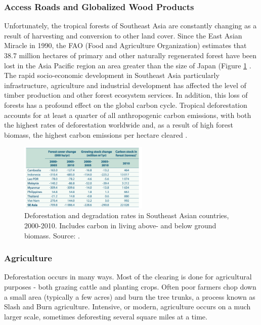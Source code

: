 \subsubsection{Access Roads and Globalized Wood Products}

Unfortunately, the tropical forests of Southeast Asia are constantly changing as a result of harvesting and conversion to other land cover. Since the East Asian Miracle in 1990, the FAO (Food and Agriculture Organization) estimates that 38.7 million hectares of primary and other naturally regenerated forest have been lost in the Asia Pacific region an area greater than the size of Japan (Figure \ref{fig:deforestation} \citep{faoun163agriculture}. The rapid socio-economic development in Southeast Asia particularly infrastructure, agriculture and industrial development has affected the level of timber production and other forest ecosystem services. In addition, this loss of forests has a profound effect on the global carbon cycle. Tropical deforestation accounts for at least a quarter of all anthropogenic carbon emissions, with both the highest rates of deforestation worldwide and, as a result of high forest biomass, the highest carbon emissions per hectare cleared \citep{corlett2014ecology}.

    \begin{figure}[ht]
    \centering
        \includegraphics[width = 0.55\textwidth]{graphics/carbonstock.png}
        \caption{Deforestation and degradation rates in Southeast Asian countries, 2000-2010. Includes carbon in living above- and below ground biomass. Source: \citep{faoun163agriculture}.}
				\label{fig:deforestation}
    \end{figure}

\subsubsection {Agriculture}

Deforestation occurs in many ways. Most of the clearing is done for agricultural purposes - both grazing cattle and planting crops. Often poor farmers chop down a small area (typically a few acres) and burn the tree trunks, a process known as Slash and Burn agriculture. Intensive, or modern, agriculture occurs on a much larger scale, sometimes deforesting several square miles at a time.

